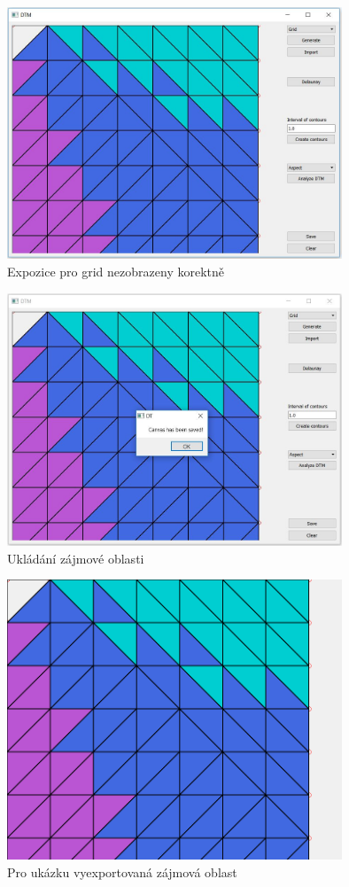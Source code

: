 \documentclass[a4paper, 12pt]{article}
\begin{document}
\begin{figure}[h!]
\centering
\includegraphics[width=10cm]{pictures/grid_aspect.jpg}
\caption{Expozice pro grid nezobrazeny korektně}
\end{figure}

\begin{figure}[h!]
\centering
\includegraphics[width=10cm]{pictures/saved.jpg}
\caption{Ukládání zájmové oblasti}
\end{figure}

\begin{figure}[h!]
\centering
\includegraphics[width=10cm]{pictures/exported.png}
\caption{Pro ukázku vyexportovaná zájmová oblast}
\end{figure}
\end{document}
